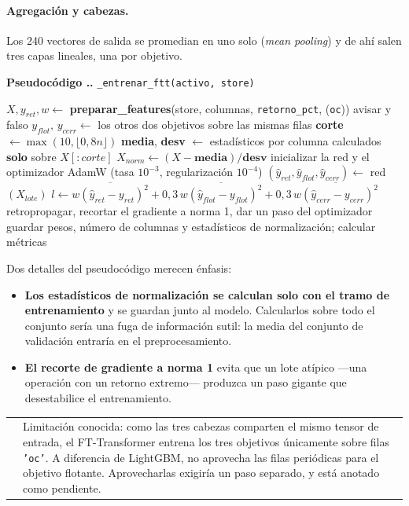 \documentclass[11pt,a4paper]{article}
\makeatletter
\newcommand{\code}[1]{\texttt{\small #1}}
\newcounter{pcode}[section]
\renewcommand{\thepcode}{\thesection.\arabic{pcode}}
\newenvironment{pseudo}[1]{%
  \par\medskip\noindent
  \refstepcounter{pcode}%
  \colorbox{cfondo}{\parbox{\dimexpr\linewidth-2\fboxsep\relax}{%
    \small\textbf{\textcolor{cazul}{Pseudocódigo \thepcode.}} #1}}%
  \par\nobreak\smallskip\begin{algorithmic}[1]%
}{\end{algorithmic}\par\medskip}
\newenvironment{nota}{%
  \par\medskip\noindent
  \begin{tabular}{@{}p{0.4em}@{\hspace{8pt}}p{\dimexpr\linewidth-2em\relax}@{}}
  \textcolor{cnaranja}{\rule{3pt}{1.1em}} &
}{\end{tabular}\par\medskip}
\newcommand{\bigsep}{\par\vspace{3pt}}
\makeatother
\begin{document}
\paragraph{Agregación y cabezas.} Los 240 vectores de salida se promedian en uno solo
(\textit{mean pooling}) y de ahí salen tres capas lineales, una por objetivo.

\begin{pseudo}{\code{_entrenar_ftt(activo, store)}}
\State $X, y_{ret}, w \gets$ \textbf{preparar_features}(store, columnas, \code{retorno_pct}, (\code{oc}))
 avisar y \Return falso \EndIf
\State $y_{flot},\, y_{cerr} \gets$ los otros dos objetivos sobre las mismas filas
\State \textbf{corte} $\gets \max(10, \lfloor 0{,}8 n \rfloor)$
\State \textbf{media}, \textbf{desv} $\gets$ estadísticos por columna calculados \textbf{solo} sobre $X[:corte]$
\State $X_{norm} \gets (X - \textbf{media}) / \textbf{desv}$ 
\State inicializar la red y el optimizador AdamW (tasa $10^{-3}$, regularización $10^{-4}$)
     \State $(\hat y_{ret}, \hat y_{flot}, \hat y_{cerr}) \gets$ red$(X_{lote})$
     \State $l \gets \overline{w(\hat y_{ret} - y_{ret})^2} + 0{,}3\,\overline{w(\hat y_{flot} - y_{flot})^2} + 0{,}3\,\overline{w(\hat y_{cerr} - y_{cerr})^2}$
     \State retropropagar, recortar el gradiente a norma 1, dar un paso del optimizador
  \EndFor
\EndFor
\State guardar pesos, número de columnas y estadísticos de normalización; calcular métricas
\end{pseudo}

\bigsep
Dos detalles del pseudocódigo merecen énfasis:

\begin{itemize}[leftmargin=1.4em,itemsep=2pt]
\item \textbf{Los estadísticos de normalización se calculan solo con el tramo de
entrenamiento} y se guardan junto al modelo. Calcularlos sobre todo el conjunto sería una
fuga de información sutil: la media del conjunto de validación entraría en el
preprocesamiento.
\item \textbf{El recorte de gradiente a norma 1} evita que un lote atípico —una operación con
un retorno extremo— produzca un paso gigante que desestabilice el entrenamiento.
\end{itemize}

\begin{nota}
Limitación conocida: como las tres cabezas comparten el mismo tensor de entrada, el
FT-Transformer entrena los tres objetivos únicamente sobre filas \code{'oc'}. A diferencia de
LightGBM, no aprovecha las filas periódicas para el objetivo flotante. Aprovecharlas exigiría
un paso separado, y está anotado como pendiente.
\end{nota}
\end{document}
